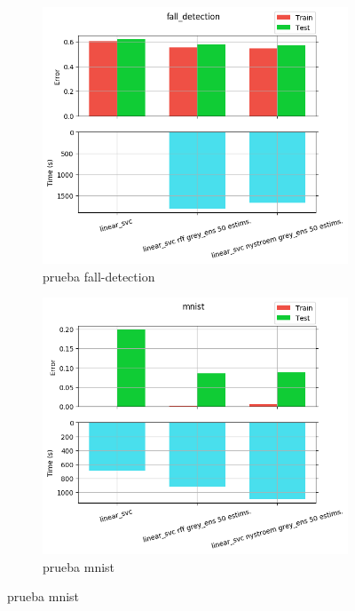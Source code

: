 \begin{figure}[ht]
  \centering
  \begin{subfigure}[b]{0.5\linewidth}
    \centering\includegraphics[width=\imgscale\linewidth]{Figures/2_8/fall_detection}
    \caption{prueba fall-detection}
    \label{fig:2_8_fall_detection}
  \end{subfigure}%
  \begin{subfigure}[b]{0.5\linewidth}
    \centering\includegraphics[width=\imgscale\linewidth]{Figures/2_8/mnist}
    \caption{prueba mnist}
    \label{fig:2_8_mnist}
  \end{subfigure}
\end{figure}


